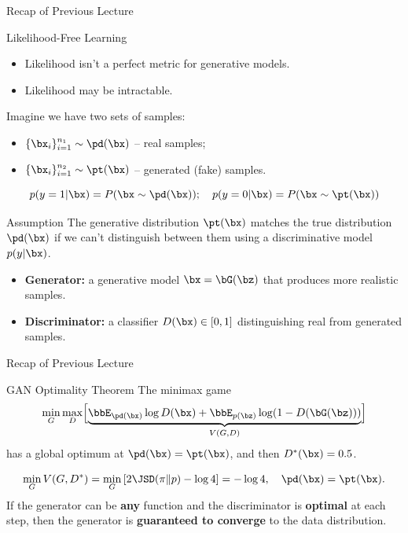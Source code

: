 \documentclass{beamer}
\begin{document}
\begin{frame}
	\titlepage
	\resetonslide
\end{frame}

\begin{frame}{Recap of Previous Lecture}
	\begin{block}{Likelihood-Free Learning}
		\begin{itemize}
			\item Likelihood isn't a perfect metric for generative models.
			\item Likelihood may be intractable.
		\end{itemize}
	\end{block}
	Imagine we have two sets of samples:
	\begin{itemize}
		\item $\{\bx_i\}_{i=1}^{n_1} \sim \pd(\bx)$ -- real samples;
		\item $\{\bx_i\}_{i=1}^{n_2} \sim \pt(\bx)$ -- generated (fake) samples.
	\end{itemize}
	\[
		p(y = 1 | \bx) = P(\bx \sim \pd(\bx)); \quad p(y = 0 | \bx) = P(\bx \sim \pt(\bx))
	\]
	\vspace{-0.5cm}
	\begin{block}{Assumption}
		The generative distribution $\pt(\bx)$ matches the true distribution $\pd(\bx)$ if we can't distinguish between them using a discriminative model $p(y|\bx)$.
	\end{block}
	\begin{itemize}
		\item \textbf{Generator:} a generative model $\bx = \bG(\bz)$ that produces more realistic samples.
		\item \textbf{Discriminator:} a classifier $D(\bx) \in [0, 1]$ distinguishing real from generated samples.
	\end{itemize}
\end{frame}
\begin{frame}{Recap of Previous Lecture}
	\begin{block}{GAN Optimality Theorem}
		The minimax game
		\[
		\min_{G} \max_D \Bigl[ \underbrace{\bbE_{\pd(\bx)} \log D(\bx) + \bbE_{p(\bz)} \log (1 - D(\bG(\bz)))}_{V(G, D)} \Bigr]
		\]
		has a global optimum at $\pd(\bx) = \pt(\bx)$, and then $D^*(\bx) = 0.5$.
	\end{block}
	\vspace{-0.3cm}
	\[
		\min_{G} V(G, D^*) = \min_{G} \left[ 2 \JSD(\pi \| p) - \log 4 \right] = -\log 4, \quad \pd(\bx) = \pt(\bx).
	\]
	If the generator can be \textbf{any} function and the discriminator is \textbf{optimal} at each step, then the generator is \textbf{guaranteed to converge} to the data distribution.  
\end{frame}
\end{document}
